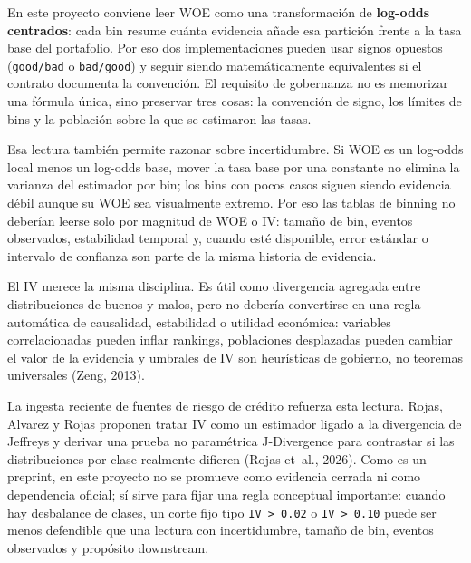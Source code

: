 \documentclass[
  spanish,
  11pt,
  letterpaper,
]{scrbook}
\theoremstyle{plain}
\theoremstyle{remark}
\begin{document}
\begin{tcolorbox}[enhanced jigsaw, arc=.35mm, bottomrule=.15mm, bottomtitle=1mm, breakable, colback=white, colbacktitle=quarto-callout-note-color!10!white, colframe=quarto-callout-note-color-frame, coltitle=black, left=2mm, leftrule=.75mm, opacityback=0, opacitybacktitle=0.6, rightrule=.15mm, title=\textcolor{quarto-callout-note-color}{\faInfo}\hspace{0.5em}{WOE como evidencia, no solo encoding}, titlerule=0mm, toprule=.15mm, toptitle=1mm]

En este proyecto conviene leer WOE como una transformación de
\textbf{log-odds centrados}: cada bin resume cuánta evidencia añade esa
partición frente a la tasa base del portafolio. Por eso dos
implementaciones pueden usar signos opuestos (\texttt{good/bad} o
\texttt{bad/good}) y seguir siendo matemáticamente equivalentes si el
contrato documenta la convención. El requisito de gobernanza no es
memorizar una fórmula única, sino preservar tres cosas: la convención de
signo, los límites de bins y la población sobre la que se estimaron las
tasas.

Esa lectura también permite razonar sobre incertidumbre. Si WOE es un
log-odds local menos un log-odds base, mover la tasa base por una
constante no elimina la varianza del estimador por bin; los bins con
pocos casos siguen siendo evidencia débil aunque su WOE sea visualmente
extremo. Por eso las tablas de binning no deberían leerse solo por
magnitud de WOE o IV: tamaño de bin, eventos observados, estabilidad
temporal y, cuando esté disponible, error estándar o intervalo de
confianza son parte de la misma historia de evidencia.

El IV merece la misma disciplina. Es útil como divergencia agregada
entre distribuciones de buenos y malos, pero no debería convertirse en
una regla automática de causalidad, estabilidad o utilidad económica:
variables correlacionadas pueden inflar rankings, poblaciones
desplazadas pueden cambiar el valor de la evidencia y umbrales de IV son
heurísticas de gobierno, no teoremas universales (Zeng, 2013).

La ingesta reciente de fuentes de riesgo de crédito refuerza esta
lectura. Rojas, Alvarez y Rojas proponen tratar IV como un estimador
ligado a la divergencia de Jeffreys y derivar una prueba no paramétrica
J-Divergence para contrastar si las distribuciones por clase realmente
difieren (Rojas et~al., 2026). Como es un preprint, en este proyecto no
se promueve como evidencia cerrada ni como dependencia oficial; sí sirve
para fijar una regla conceptual importante: cuando hay desbalance de
clases, un corte fijo tipo \texttt{IV\ \textgreater{}\ 0.02} o
\texttt{IV\ \textgreater{}\ 0.10} puede ser menos defendible que una
lectura con incertidumbre, tamaño de bin, eventos observados y propósito
downstream.


\end{tcolorbox}
\end{document}
